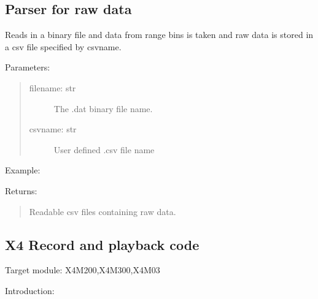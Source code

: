 \documentclass[letterpaper,10pt,english]{sphinxmanual}
\begin{document}
\subsection{Parser for raw data}
\label{\detokenize{X4 radar:parser-for-raw-data}}

\begin{fulllineitems}
Reads in a binary file and data from range bins is taken and raw data is stored in a csv file specified by csvname.

Parameters:
\begin{quote}
\begin{description}
\item[{filename: str}] \leavevmode
The .dat binary file name.

\item[{csvname: str}] \leavevmode
User defined .csv file name

\end{description}
\end{quote}

Example:

\begin{sphinxVerbatim}[commandchars=\\\{\}]
\end{sphinxVerbatim}

Returns:
\begin{quote}

Readable csv files containing raw data.
\end{quote}

\end{fulllineitems}



\subsection{X4 Record and playback code}
\label{\detokenize{X4 radar:x4-record-and-playback-code}}
Target module: X4M200,X4M300,X4M03

Introduction:
\end{document}
